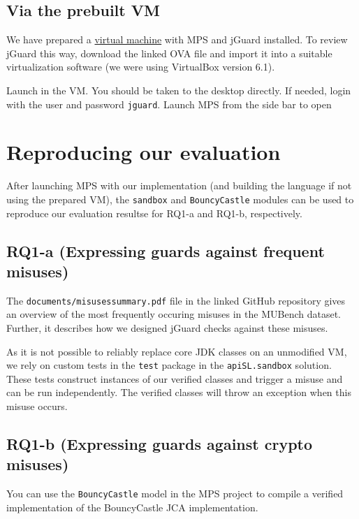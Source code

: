 \documentclass[parskip=full]{scrreprt}
\begin{document}
\subsection{Via the prebuilt VM}

We have prepared a \href{https://zenodo.org/record/5767812/files/jGuard_fixed.ova?download=1}{virtual machine} with MPS and jGuard installed.
To review jGuard this way, download the linked OVA file and import it into a suitable virtualization software (we were using VirtualBox version 6.1).

Launch in the VM. You should be taken to the desktop directly. If needed, login with the user and password \texttt{jguard}. Launch MPS from the side bar to open 

\section{Reproducing our evaluation}

After launching MPS with our implementation (and building the language if not using the prepared VM), the \texttt{sandbox} and \texttt{BouncyCastle} modules can be used to
reproduce our evaluation resultse for RQ1-a and RQ1-b, respectively.

\subsection{RQ1-a (Expressing guards against frequent misuses)}

The \texttt{documents/misusessummary.pdf} file in the linked GitHub repository gives an
overview of the most frequently occuring misuses in the MUBench dataset.
Further, it describes how we designed jGuard checks against these misuses.

As it is not possible to reliably replace core JDK classes on an unmodified VM, we rely
on custom tests in the \texttt{test} package in the \texttt{apiSL.sandbox} solution.
These tests construct instances of our verified classes and trigger a misuse and can be
run independently.
The verified classes will throw an exception when this misuse occurs.

\subsection{RQ1-b (Expressing guards against crypto misuses)}

You can use the \texttt{BouncyCastle} model in the MPS project to compile a verified implementation of the BouncyCastle JCA implementation.
\end{document}
